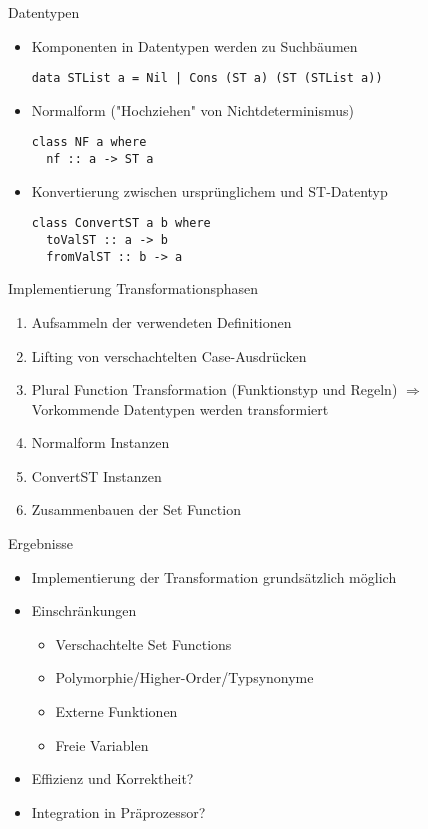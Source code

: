 \documentclass{beamer}
\begin{document}
\begin{frame}[fragile]{Datentypen}
\begin{itemize}
\item Komponenten in Datentypen werden zu Suchbäumen
\begin{verbatim}
data STList a = Nil | Cons (ST a) (ST (STList a))
\end{verbatim}
\item Normalform ("Hochziehen" von Nichtdeterminismus)
\begin{verbatim}
class NF a where
  nf :: a -> ST a
\end{verbatim}
\item Konvertierung zwischen ursprünglichem und ST-Datentyp
\begin{verbatim}
class ConvertST a b where
  toValST :: a -> b
  fromValST :: b -> a
\end{verbatim}
\end{itemize}
\end{frame}

\begin{frame}{Implementierung}
Transformationsphasen
\begin{enumerate}
\item Aufsammeln der verwendeten Definitionen
\item Lifting von verschachtelten Case-Ausdrücken
\item Plural Function Transformation (Funktionstyp und Regeln) $\Rightarrow$ 
Vorkommende Datentypen werden transformiert
\item Normalform Instanzen
\item ConvertST Instanzen
\item Zusammenbauen der Set Function
\end{enumerate}
\end{frame}

\begin{frame}{Ergebnisse}
\begin{itemize}
\item Implementierung der Transformation grundsätzlich möglich
\item Einschränkungen
\begin{itemize}
\item Verschachtelte Set Functions
\item Polymorphie/Higher-Order/Typsynonyme
\item Externe Funktionen
\item Freie Variablen
\end{itemize}
\item Effizienz und Korrektheit?
\item Integration in Präprozessor?
\end{itemize}
\end{frame}

\begin{frame}


\end{frame}
\end{document}
